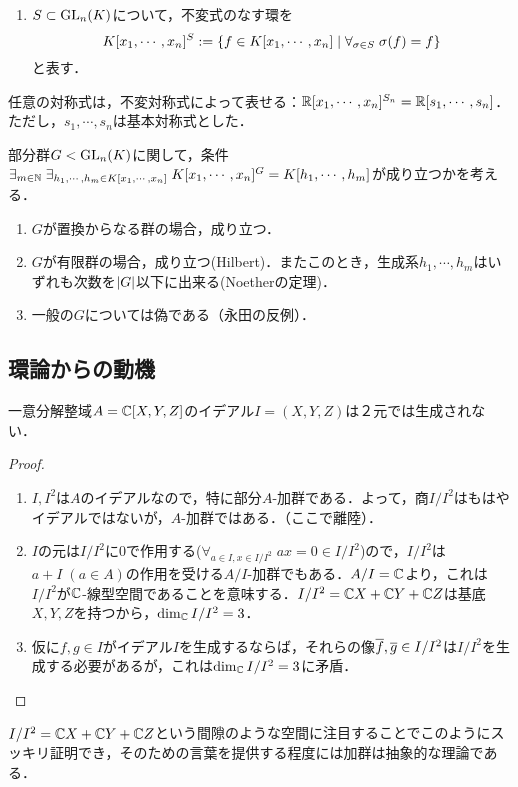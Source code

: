 \documentclass[uplatex,dvipdfmx]{jsreport}
\begin{document}
\begin{definition}\mbox{}
    \begin{enumerate}
        \item $S\subset\mathrm{GL}_n(K)$について，不変式のなす環を
        \[K[x_1,\cdots,x_n]^S:=\left\{f\in K[x_1,\cdots,x_n]\mid\forall_{\sigma\in S}\;\sigma(f)=f\right\}\]
        と表す．
    \end{enumerate}
\end{definition}

\begin{corollary}
    任意の対称式は，不変対称式によって表せる：$\mathbb{R}[x_1,\cdots,x_n]^{S_n}=\mathbb{R}[s_1,\cdots,s_n]$．ただし，$s_1,\cdots,s_n$は基本対称式とした．
\end{corollary}

\begin{theorem}[Hilbert 14]
    部分群$G<\mathrm{GL}_n(K)$に関して，条件
    $\exists_{m\in\mathbb{N}}\;\exists_{h_1,\cdots,h_m\in K[x_1,\cdots,x_n]}\;K[x_1,\cdots,x_n]^G=K[h_1,\cdots,h_m]$が成り立つかを考える．
    \begin{enumerate}
        \item $G$が置換からなる群の場合，成り立つ．
        \item $G$が有限群の場合，成り立つ(Hilbert)．またこのとき，生成系$h_1,\cdots,h_m$はいずれも次数を$\lvert G\rvert$以下に出来る(Noetherの定理)．
        \item 一般の$G$については偽である（永田の反例）．
    \end{enumerate}
\end{theorem}

\subsection{環論からの動機}

\begin{proposition}[イデアルの剰余が加群になる]
    一意分解整域$A=\mathbb{C}[X,Y,Z]$のイデアル$I=(X,Y,Z)$は２元では生成されない．
\end{proposition}
\begin{proof}\mbox{}
    \begin{enumerate}
        \item $I,I^2$は$A$のイデアルなので，特に部分$A$-加群である．よって，商$I/I^2$はもはやイデアルではないが，$A$-加群ではある．（ここで離陸）．
        \item $I$の元は$I/I^2$に$0$で作用する($\forall_{a\in I,x\in I/I^2}\;ax=0\in I/I^2$)ので，$I/I^2$は$a+I\;(a\in A)$の作用を受ける$A/I$-加群でもある．$A/I=\mathbb{C}$より，これは$I/I^2$が$\mathbb{C}$-線型空間であることを意味する．$I/I^2=\mathbb{C} X+\mathbb{C} Y+\mathbb{C} Z$は基底$X,Y,Z$を持つから，$\dim_{\mathbb{C}} I/I^2=3$．
        \item 仮に$f,g\in I$がイデアル$I$を生成するならば，それらの像$\overline{f},\overline{g}\in I/I^2$は$I/I^2$を生成する必要があるが，これは$\dim_{\mathbb{C}} I/I^2=3$に矛盾．
    \end{enumerate}
\end{proof}
\begin{remarks}
    $I/I^2=\mathbb{C} X+\mathbb{C} Y+\mathbb{C} Z$という間隙のような空間に注目することでこのようにスッキリ証明でき，そのための言葉を提供する程度には加群は抽象的な理論である．
\end{remarks}
\end{document}
